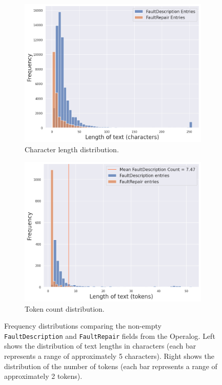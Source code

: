 \documentclass[10pt,oneside]{report}
\begin{document}
\begin{figure}[htbp]
    \centering
    \begin{subfigure}[b]{0.48\textwidth}
        \centering
        \includegraphics[width=\textwidth]{FaultDescriptionVSFaultRepairs.png}
        \caption{Character length distribution.}
        \label{fig:FaultDescriptionVSFaultRepairs}
    \end{subfigure}
    \hfill
    \begin{subfigure}[b]{0.48\textwidth}
        \centering
        \includegraphics[width=\textwidth]{./images/ionSourceTokenCountDist.png}
        \caption{Token count distribution.}
        \label{fig:ionSourceTokenCountDist}
    \end{subfigure}
    \caption[Operalog Field Length Distributions]{Frequency distributions comparing the non-empty \texttt{FaultDescription} and \texttt{FaultRepair} fields from the Operalog. Left shows the distribution of text lengths in characters (each bar represents a range of approximately 5 characters). Right shows the distribution of the number of tokens (each bar represents a range of approximately 2 tokens).}
    \label{fig:hists}
\end{figure}
\end{document}
